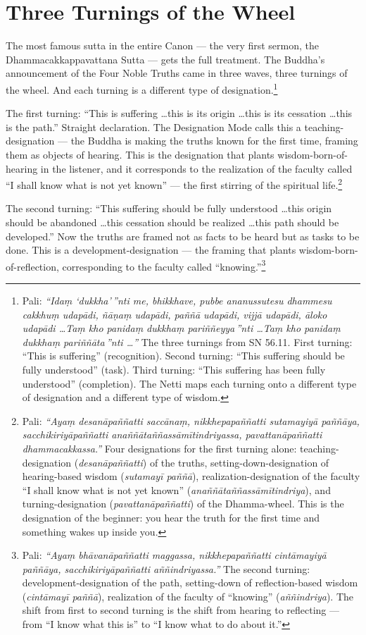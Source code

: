 \section*{Three Turnings of the Wheel}

The most famous sutta in the entire Canon --- the very first sermon, the Dhammacakkappavattana Sutta --- gets the full treatment. The Buddha's announcement of the Four Noble Truths came in three waves, three turnings of the wheel. And each turning is a different type of designation.\footnote{Pali: \textit{``Idaṃ `dukkha'\,''nti me, bhikkhave, pubbe ananussutesu dhammesu cakkhuṃ udapādi, ñāṇaṃ udapādi, paññā udapādi, vijjā udapādi, āloko udapādi \ldots Taṃ kho panidaṃ dukkhaṃ pariññeyya\,''nti \ldots Taṃ kho panidaṃ dukkhaṃ pariññāta\,''nti \ldots''} The three turnings from SN 56.11. First turning: ``This is suffering'' (recognition). Second turning: ``This suffering should be fully understood'' (task). Third turning: ``This suffering has been fully understood'' (completion). The Netti maps each turning onto a different type of designation and a different type of wisdom.}

The first turning: ``This is suffering \ldots this is its origin \ldots this is its cessation \ldots this is the path.'' Straight declaration. The Designation Mode calls this a teaching-designation --- the Buddha is making the truths known for the first time, framing them as objects of hearing. This is the designation that plants wisdom-born-of-hearing in the listener, and it corresponds to the realization of the faculty called ``I shall know what is not yet known'' --- the first stirring of the spiritual life.\footnote{Pali: \textit{``Ayaṃ desanāpaññatti saccānaṃ, nikkhepapaññatti sutamayiyā paññāya, sacchikiriyāpaññatti anaññātaññassāmītindriyassa, pavattanāpaññatti dhammacakkassa.''} Four designations for the first turning alone: teaching-designation (\textit{desanāpaññatti}) of the truths, setting-down-designation of hearing-based wisdom (\textit{sutamayī paññā}), realization-designation of the faculty ``I shall know what is not yet known'' (\textit{anaññātaññassāmītindriya}), and turning-designation (\textit{pavattanāpaññatti}) of the Dhamma-wheel. This is the designation of the beginner: you hear the truth for the first time and something wakes up inside you.}

The second turning: ``This suffering should be fully understood \ldots this origin should be abandoned \ldots this cessation should be realized \ldots this path should be developed.'' Now the truths are framed not as facts to be heard but as tasks to be done. This is a development-designation --- the framing that plants wisdom-born-of-reflection, corresponding to the faculty called ``knowing.''\footnote{Pali: \textit{``Ayaṃ bhāvanāpaññatti maggassa, nikkhepapaññatti cintāmayiyā paññāya, sacchikiriyāpaññatti aññindriyassa.''} The second turning: development-designation of the path, setting-down of reflection-based wisdom (\textit{cintāmayī paññā}), realization of the faculty of ``knowing'' (\textit{aññindriya}). The shift from first to second turning is the shift from hearing to reflecting --- from ``I know what this is'' to ``I know what to do about it.''}

